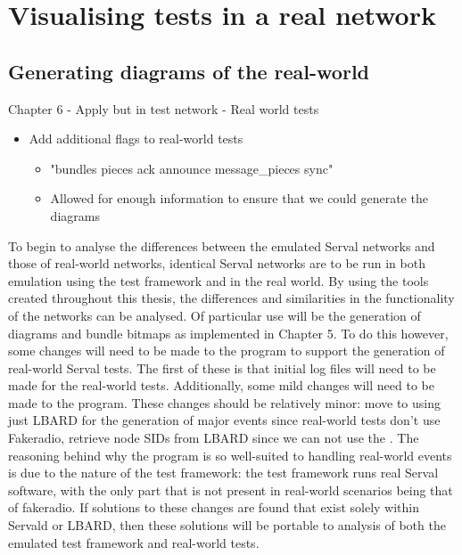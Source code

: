
\chapter{Visualising tests in a real network} %

\label{Chapter6} %


\section{Generating diagrams of the real-world}
Chapter 6
- Apply but in test network
- Real world tests

\begin{itemize}
    \item Add additional flags to real-world tests
    \begin{itemize}
        \item "bundles pieces ack announce message\_pieces sync"
        \item  Allowed for enough information to ensure that we could generate the diagrams
    \end{itemize}
\end{itemize}

To begin to analyse the differences between the emulated Serval networks and those of real-world networks, identical Serval networks are to be run in both emulation using the test framework and in the real world.
By using the tools created throughout this thesis, the differences and similarities in the functionality of the networks can be analysed.
Of particular use will be the generation of diagrams and bundle bitmaps as implemented in Chapter 5.
To do this however, some changes will need to be made to the program to support the generation of real-world Serval tests.
The first of these is that initial log files will need to be made for the real-world tests.
Additionally, some mild changes will need to be made to the program. 
These changes should be relatively minor: move to using just LBARD for the generation of major events since real-world tests don't use Fakeradio, retrieve node SIDs from LBARD since we can not use the .
The reasoning behind why the program is so well-suited to handling real-world events is due to the nature of the test framework: the test framework runs real Serval software, with the only part that is not present in real-world scenarios being that of fakeradio.
If solutions to these changes are found that exist solely within Servald or LBARD, then these solutions will be portable to analysis of both the emulated test framework and real-world tests.

